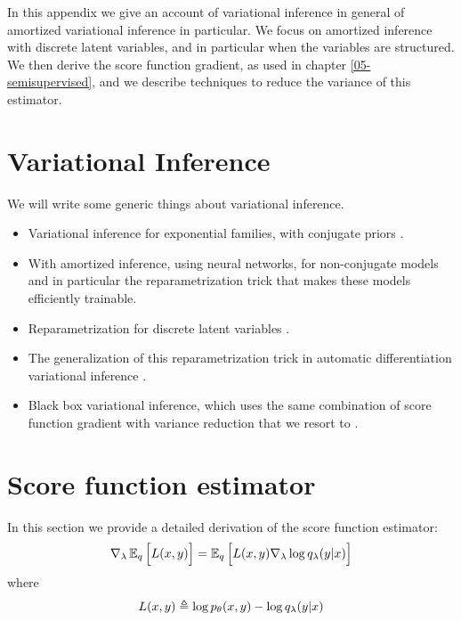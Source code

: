 % 

In this appendix we give an account of variational inference in general of amortized variational inference in particular. We focus on amortized inference with discrete latent variables, and in particular when the variables are structured. We then derive the score function gradient, as used in chapter \ref{05-semisupervised}, and we describe techniques to reduce the variance of this estimator.


\section{Variational Inference}
We will write some generic things about variational inference.
\begin{itemize}
  \item Variational inference for exponential families, with conjugate priors \citep{jordan1999vi,jordan2008graphical,blei2016vi}.
  \item With amortized inference, using neural networks, for non-conjugate models \citep{kingma2014vae,rezende2014dgm} and in particular the reparametrization trick that makes these models efficiently trainable.
  \item Reparametrization for discrete latent variables \citep{maddison2017concrete,jang2017gumbel}.
  \item The generalization of this reparametrization trick in automatic differentiation variational inference \citep{kucukelbir2017automatic}.
  \item Black box variational inference, which uses the same combination of score function gradient with variance reduction that we resort to \citep{ranganath2014black}.
\end{itemize}


\section{Score function estimator}
In this section we provide a detailed derivation of the score function estimator:
\begin{align}
  \label{eq:score-function-estimator}
  \nabla_{\lambda} \operatorname{\mathbb{E}}_{q} \Big[ L(x, y) \Big] = \operatorname{\mathbb{E}}_{q} \Big[ L(x, y) \nabla_{\lambda} \log q_{\lambda}(y | x) \Big]
\end{align}
where
\begin{equation*}
  L(x, y) \triangleq \log p_{\theta}(x, y) - \log q_{\lambda}(y | x)
\end{equation*}

